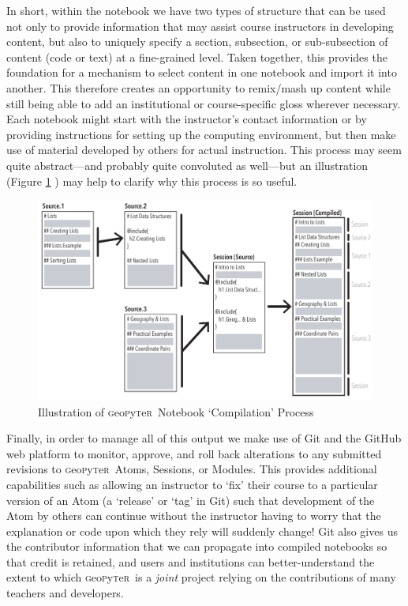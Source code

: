\documentclass[letter, 11pt]{article}
\newcommand{\gp}{\textsc{g}eo\textsc{p}y\textsc{t}e\textsc{r}~\/}
\begin{document}
In short, within the notebook we have two types of structure that can be used
not only to provide information that may assist course instructors in developing
content, but also to uniquely specify a section, subsection, or sub-subsection
of content (code or text) at a fine-grained level. Taken together, this provides
the foundation for a mechanism to select content in one notebook and import it
into another. This therefore creates an opportunity to remix/mash up content
while still being able to add an institutional or course-specific gloss wherever
necessary. Each notebook might start with the instructor's contact information
or by providing instructions for setting up the computing environment, but then
make use of material developed by others for actual instruction. This process
may seem quite abstract---and probably quite convoluted as well---but an
illustration (Figure \ref{fig:Illustration} )
may help to clarify why this process is so useful.

\begin{figure}[hbtp]
  \centering
  \includegraphics[width=\textwidth, angle=0]{Illustration.pdf}
  \caption{Illustration of \gp Notebook `Compilation' Process}
  \label{fig:Illustration}
\end{figure}

Finally, in order to manage all of this output we make use of Git and the GitHub
web platform to monitor, approve, and roll back alterations to any submitted
revisions to \gp Atoms, Sessions, or Modules. This provides additional
capabilities such as allowing an instructor to `fix' their course to a
particular version of an Atom (a `release' or `tag' in Git) such that
development of the Atom by others can continue without the instructor having to
worry that the explanation or code upon which they rely will suddenly change!
Git also gives us the contributor information that we can propagate into
compiled notebooks so that credit is retained, and users and institutions can
better-understand the extent to which \gp is a \emph{joint} project relying on
the contributions of many teachers and developers.
\end{document}
